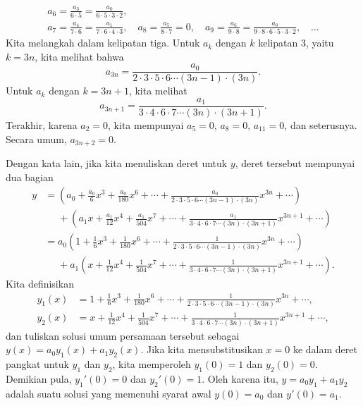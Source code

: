 \begin{example}
\begin{multline*}
a_6 = \frac{a_3}{6 \cdot 5} = \frac{a_0}{6 \cdot 5 \cdot 3 \cdot 2},
\\
a_7 = \frac{a_4}{7 \cdot 6} = \frac{a_1}{7 \cdot 6 \cdot 4 \cdot 3}, \quad
a_8 = \frac{a_5}{8 \cdot 7} = 0, \quad
a_9 = \frac{a_6}{9 \cdot 8} = \frac{a_0}{9 \cdot 8 \cdot 6 \cdot 5 \cdot 3
\cdot 2}, \quad
\ldots
\end{multline*}
Kita melangkah dalam kelipatan tiga.
Untuk $a_k$ dengan $k$ kelipatan $3$, yaitu $k=3n$, kita melihat
bahwa
\begin{equation*}
a_{3n} = \frac{a_0}{2 \cdot 3 \cdot 5 \cdot 6 \cdots (3n-1) \cdot (3n)} .
\end{equation*}
Untuk $a_k$ dengan $k = 3n+1$, kita melihat
\begin{equation*}
a_{3n+1} = \frac{a_1}{3 \cdot 4 \cdot 6 \cdot 7 \cdots (3n) \cdot (3n+1)} .
\end{equation*}
Terakhir, karena $a_2 = 0$, kita mempunyai $a_5 = 0$, $a_8 = 0$, $a_{11}=0$, dan seterusnya.
Secara umum, $a_{3n+2} = 0$.

Dengan kata lain, jika kita menuliskan deret untuk $y$,
deret tersebut mempunyai dua bagian
\begin{equation*}
\begin{split}
y &=
\left(
a_0 + \frac{a_0}{6} x^3 + \frac{a_0}{180} x^6 + \cdots +
\frac{a_0}{2 \cdot 3 \cdot 5 \cdot 6 \cdots (3n-1) \cdot (3n)} x^{3n} + \cdots
\right)
\\
&\phantom{=}
+
\left(
a_1 x + \frac{a_1}{12} x^4 + \frac{a_1}{504} x^7 + \cdots +
\frac{a_1}{3 \cdot 4 \cdot 6 \cdot 7 \cdots (3n) \cdot (3n+1)} x^{3n+1} + \cdots
\right)
\\
& =
a_0
\left(
1 + \frac{1}{6} x^3 + \frac{1}{180} x^6 + \cdots +
\frac{1}{2 \cdot 3 \cdot 5 \cdot 6 \cdots (3n-1) \cdot (3n)} x^{3n} + \cdots
\right)
\\
&\phantom{=}
+
a_1
\left(
x + \frac{1}{12} x^4 + \frac{1}{504} x^7 + \cdots +
\frac{1}{3 \cdot 4 \cdot 6 \cdot 7 \cdots (3n) \cdot (3n+1)} x^{3n+1} + \cdots
\right) .
\end{split}
\end{equation*}
Kita definisikan
\begin{align*}
y_1(x) &= 
1 + \frac{1}{6} x^3 + \frac{1}{180} x^6 + \cdots +
\frac{1}{2 \cdot 3 \cdot 5 \cdot 6 \cdots (3n-1) \cdot (3n)} x^{3n} + \cdots, \\
y_2(x) &= 
x + \frac{1}{12} x^4 + \frac{1}{504} x^7 + \cdots +
\frac{1}{3 \cdot 4 \cdot 6 \cdot 7 \cdots (3n) \cdot (3n+1)} x^{3n+1} + \cdots ,
\end{align*}
dan tuliskan solusi umum persamaan tersebut sebagai
$y(x)= a_0 y_1(x) + a_1 y_2(x)$. Jika kita mensubstitusikan $x=0$ ke dalam
deret pangkat untuk $y_1$ dan $y_2$, kita memperoleh
$y_1(0) = 1$ dan $y_2(0) = 0$. Demikian pula,
$y_1'(0) = 0$ dan $y_2'(0) = 1$. Oleh karena itu, $y = a_0 y_1 + a_1 y_2$
adalah suatu solusi
yang memenuhi syarat awal $y(0) = a_0$ dan $y'(0) = a_1$.


\end{example}
